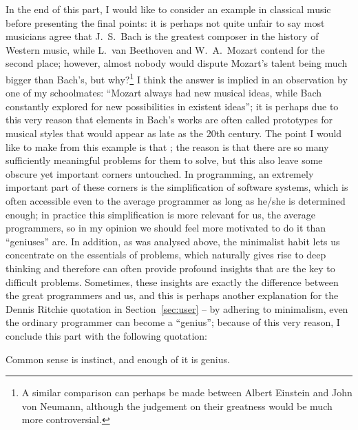 In the end of this part, I would like to consider an example in classical
music before presenting the final points: it is perhaps not quite unfair
to say most musicians agree that J.~S.\ Bach is the greatest composer in
the history of Western music, while L.\ van Beethoven and W.~A.\ Mozart
contend for the second place; however, almost nobody would dispute Mozart's
talent being much bigger than Bach's, but why?\footnote{A similar comparison
can perhaps be made between Albert Einstein and John von Neumann, although the
judgement on their greatness would be much more controversial.}  I think the
answer is implied in an observation by one of my schoolmates: ``Mozart always
had new musical ideas, while Bach constantly explored for new possibilities in
existent ideas''; it is perhaps due to this very reason that elements in Bach's
works are often called prototypes for musical styles that would appear as late
as the 20th century.  The point I would like to make from this example is
that ; the reason is that
there are so many sufficiently meaningful problems for them to solve, but this
also leave some obscure yet important corners untouched.  In programming, an
extremely important part of these corners is the simplification of software
systems, which is often accessible even to the average programmer as long as
he/she is determined enough; in practice this simplification is more relevant
for us, the average programmers, so in my opinion we should feel more
motivated to do it than ``geniuses'' are.  In addition, as was analysed
above, the minimalist habit lets us concentrate on the essentials of problems,
which naturally gives rise to deep thinking and therefore can often provide
profound insights that are the key to difficult problems.  Sometimes, these
insights are exactly the difference between the great programmers and us,
and this is perhaps another explanation for the Dennis Ritchie quotation
in Section~\ref{sec:user} -- by adhering to minimalism, even the
ordinary programmer can become a ``genius''; because of this very
reason, I conclude this part with the following quotation:
\begin{quoting}
	Common sense is instinct, and enough of it is genius.
\end{quoting}

